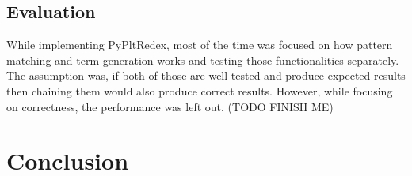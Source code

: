 \subsection{Evaluation}
While implementing PyPltRedex, most of the time was focused on how pattern matching and term-generation works and testing those functionalities separately. The assumption was, if both of those are well-tested and produce expected results then chaining them would also produce correct results. However, while focusing on correctness, the performance was left out. (TODO FINISH ME)


\section{Conclusion}
